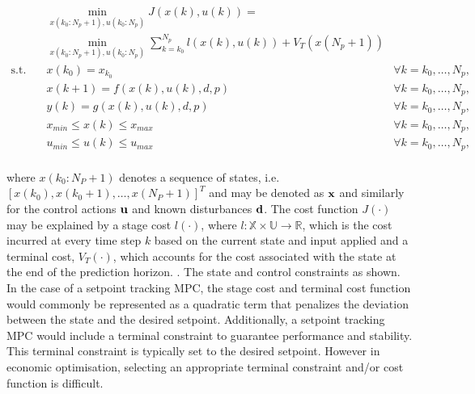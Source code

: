 \begin{equation}
	\begin{aligned}
		& \min_{x(k_0:N_p+1),u(k_0:N_p)} J(x(k),u(k)) = \\ 
		& \min_{x(k_0:N_p+1),u(k_0:N_p)} \sum_{k=k_0}^{N_p} l(x(k),u(k)) + V_T(x(N_p +1))  \\
		\text{s.t.} \quad  & x(k_0) = x_{k_0}                              & \forall k = k_0,\hdots, N_p,\\
		& x(k+1) = f(x(k),u(k),d, p)       & \forall k = k_0,\hdots, N_p,\\
		& y(k) = g(x(k),u(k),d,p)                 & \forall k = k_0,\hdots, N_p,\\
		& x_{min} \leq x(k) \leq x_{max}                  & \forall k = k_0,\hdots, N_p,\\
		& u_{min} \leq u(k) \leq u_{max}                  & \forall k = k_0,\hdots, N_p,\\
	\end{aligned}
	\label{eq:mcp ocp}
\end{equation}

where $x(k_0:N_P+1)$ denotes a sequence of states, i.e. $[x(k_0), x(k_0+1), \hdots, x(N_P+1)]^T$ and may be denoted as $\bold{x}$ and similarly for the control actions $\bold{u}$ and known disturbances $\bold{d}$. The cost function $J(\cdot)$ may be explained by a stage cost $l(\cdot)$, where $l: \mathbb X \times \mathbb U \rightarrow \mathbb R$, which is the cost incurred at every time step $k$ based on the current state and input applied and a terminal cost, $V_T(\cdot)$, which accounts for the cost associated with the state at the end of the prediction horizon. \cite{daiDiscreteTimeModelPredictive2012,boersmaRobustSamplebasedModel2022}. The state and control constraints as shown. In the case of a setpoint tracking MPC, the stage cost and terminal cost function would commonly be represented as a quadratic term that penalizes the deviation between the state and the desired setpoint. Additionally, a setpoint tracking MPC would include a terminal constraint to guarantee performance and stability. This terminal constraint is typically set to the desired setpoint. However in economic optimisation, selecting an appropriate terminal constraint and/or cost function is difficult.\\

